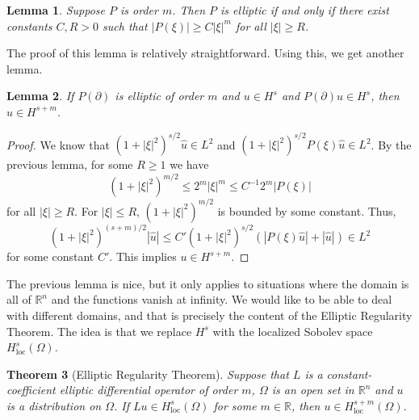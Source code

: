 \documentclass[12pt,letterpaper,reqno]{article}
\theoremstyle{plain}                              %
\newtheorem{thm}{Theorem}[section]
\newtheorem{lem}[thm]{Lemma}
\theoremstyle{definition}                         %
\theoremstyle{remark}                             %
\numberwithin{equation}{section}
\newcommand{\R}{\mathbb{R}}                     %
\begin{document}
\begin{lem}\label{lem: elliptic symbols}
    Suppose $P$ is order $m$. Then $P$ is elliptic if and only if there exist constants $C,R>0$ such that $|P(\xi)| \ge C |\xi|^m$ for all $|\xi| \ge R$.
\end{lem}
The proof of this lemma is relatively straightforward. Using this, we get another lemma.
\begin{lem}\label{lem: regularity for all of R}
    If $P(\partial)$ is elliptic of order $m$ and $u\in H^s$ and $P(\partial)u \in H^s$, then $u\in H^{s+m}$.
\end{lem}
\begin{proof}
    We know that $(1+|\xi|^2)^{s/2}\widehat{u}\in L^2$ and $(1+|\xi|^2)^{s/2}P(\xi) \widehat{u}\in L^2$. By the previous lemma, for some $R\ge 1$ we have
    \[(1+|\xi|^2)^{m/2} \le 2^m |\xi|^m \le C^{-1}2^m |P(\xi)|\]
    for all $|\xi| \ge R$. For $|\xi|\le R$, $(1+|\xi|^2)^{m/2}$ is bounded by some constant. Thus,
    \[(1+|\xi|^2)^{(s+m)/2}|\widehat{u}| \le C' (1+|\xi|^2)^{s/2}(|P(\xi) \widehat{u}|+|\widehat{u}|)\in L^2\]
    for some constant $C'$. This implies $u\in H^{s+m}$. 
\end{proof}
The previous lemma is nice, but it only applies to situations where the domain is all of $\R^n$ and the functions vanish at infinity. We would like to be able to deal with different domains, and that is precisely the content of the Elliptic Regularity Theorem. The idea is that we replace $H^s$ with the localized Sobolev space $H_\mathrm{loc}^s(\Omega)$.
\begin{thm}[Elliptic Regularity Theorem]\label{thm: ellitic regularity}
    Suppose that $L$ is a constant-coefficient elliptic differential operator of order $m$, $\Omega$ is an open set in $\R^n$ and $u$ is a distribution on $\Omega$. If $Lu \in H^s_{\mathrm{loc}}(\Omega)$ for some $m\in \R$, then $u\in H_{\mathrm{loc}}^{s+m}(\Omega)$.
\end{thm}
\end{document}
